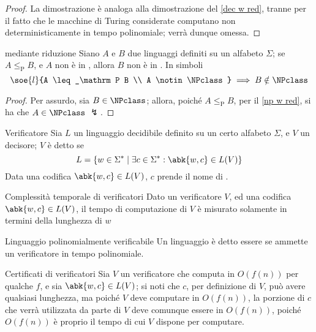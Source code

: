 \documentclass[a4paper, 12pt]{report}
\begin{document}
    \begin{proof}
        La dimostrazione è analoga alla dimostrazione del \cref{dec w red}, tranne per il fatto che le macchine di Turing considerate computano non deterministicamente in tempo polinomiale; verrà dunque omessa.
    \end{proof}

    \begin{framedcor}[label={np w red cor}]{\NPclass mediante riduzione}
        Siano $A$ e $B$ due linguaggi definiti su un alfabeto $\Sigma$; se $A \leq_\mathrm P B$, e $A$ non è in \NPclass, allora $B$ non è in \NPclass. In simboli $$\soe{l}{A \leq_\mathrm P B \\ A \notin \NPclass} \implies B \notin \NPclass$$
    \end{framedcor}

    \begin{proof}
        Per assurdo, sia $B \in \NPclass$; allora, poiché $A \leq_\mathrm P B$, per il \cref{np w red}, si ha che $A \in \NPclass$ $\lightning$.
    \end{proof}

    \begin{frameddefn}{Verificatore}
        Sia $L$ un linguaggio decidibile definito su un certo alfabeto $\Sigma$, e $V$ un decisore; $V$ è detto  se $$L = \{w \in \Sigma^* \mid \exists c \in \Sigma^* : \abk{w, c} \in L(V)\}$$ Data una codifica $\abk{w, c} \in L(V)$, $c$ prende il nome di .
    \end{frameddefn}

    \begin{framedobs}{Complessità temporale di verificatori}
        Dato un verificatore $V$, ed una codifica $\abk{w, c} \in L(V)$, il tempo di computazione di $V$ è misurato solamente in termini della lunghezza di $w$
    \end{framedobs}

    \begin{frameddefn}{Linguaggio polinomialmente verificabile}
        Un linguaggio è detto essere  se ammette un verificatore in tempo polinomiale.
    \end{frameddefn}

    \begin{framedobs}[label={certif len}]{Certificati di verificatori}
        Sia $V$ un verificatore che computa in $O(f(n))$ per qualche $f$, e sia $\abk{w, c} \in L(V)$; si noti che $c$, per definizione di $V$, può avere qualsiasi lunghezza, ma poiché $V$ deve computare in $O(f(n))$, la porzione di $c$ che verrà utilizzata da parte di $V$ deve comunque essere in $O(f(n))$, poiché $O(f(n))$ è proprio il tempo di cui $V$ dispone per computare.
    \end{framedobs}
\end{document}
